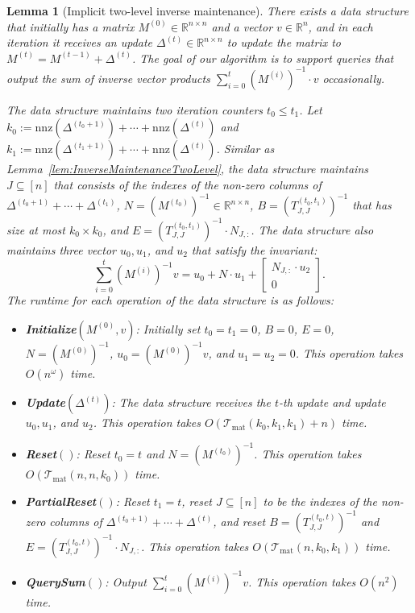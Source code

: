 \documentclass[11pt]{article}
\newtheorem{lemma}[theorem]{Lemma}
\newcommand{\Tmat}{\mathcal{T}_{\mathrm{mat}}}
\newcommand{\nnz}{\mathrm{nnz}}
\newcommand\uu{\boldsymbol{\mathit{u}}}
\newcommand\vv{\boldsymbol{\mathit{v}}}
\newcommand\BB{\boldsymbol{\mathit{B}}}
\newcommand\EE{\boldsymbol{\mathit{E}}}
\newcommand\NN{\boldsymbol{\mathit{N}}}
\newcommand\MM{\boldsymbol{\mathit{M}}}
\newcommand\TT{\boldsymbol{\mathit{T}}}
\newcommand\R{\mathbb{R}}
\begin{document}
\begin{lemma}[Implicit two-level inverse maintenance]\label{lem:implicit_inverse_maintenance}
There exists a data structure that initially has a matrix $\MM^{(0)} \in \R^{n \times n}$ and a vector $\vv \in \R^{n}$, and in each iteration it receives an update $\Delta^{(t)} \in \R^{n \times n}$ to update the matrix to $\MM^{(t)} = \MM^{(t-1)} + \Delta^{(t)}$. The goal of our algorithm is to support queries that output the sum of inverse vector products $\sum_{i=0}^t (\MM^{(i)})^{-1} \cdot \vv$ occasionally.
 

The data structure maintains two iteration counters $t_0 \leq t_1$. Let $k_0 := \nnz(\Delta^{(t_0+1)}) + \cdots + \nnz(\Delta^{(t)})$ and $k_1 := \nnz(\Delta^{(t_1+1)}) + \cdots + \nnz(\Delta^{(t)})$. Similar as Lemma~\ref{lem:InverseMaintenanceTwoLevel}, the data structure maintains $J \subseteq [n]$ that consists of the indexes of the non-zero columns of $\Delta^{(t_0+1)} + \cdots + \Delta^{(t_1)}$, $\NN = (\MM^{(t_0)})^{-1} \in \R^{n \times n}$, $\BB = (\TT^{(t_0,t_1)}_{J,J})^{-1}$ that has size at most $k_0 \times k_0$, and $\EE = (\TT^{(t_0,t_1)}_{J,J})^{-1} \cdot \NN_{J,:}$. The data structure also maintains three vector $\uu_0, \uu_1$, and $\uu_2$ that satisfy the invariant:
\[
\sum_{i=0}^t (\MM^{(i)})^{-1} \vv = \uu_0 + \NN \cdot \uu_1 + \begin{bmatrix}
\NN_{J,:} \cdot \uu_2 \\ 0
\end{bmatrix}.
\]
The runtime for each operation of the data structure is as follows:
\begin{itemize}
\item {\bf Initialize$(\MM^{(0)}, \vv)$}: Initially set $t_0 = t_1 = 0$, $\BB = 0$, $\EE = 0$, $\NN = (\MM^{(0)})^{-1}$, $\uu_0 = (\MM^{(0)})^{-1} \vv$, and $\uu_1 = \uu_2 = 0$. This operation takes $O(n^{\omega})$ time.
\item {\bf Update$(\Delta^{(t)})$}: The data structure receives the $t$-th update and update $\uu_0, \uu_1$, and $\uu_2$. This operation takes $O(\Tmat(k_0, k_1, k_1) + n)$ time.
\item {\bf Reset$()$}: Reset $t_0 = t$ and $\NN = (\MM^{(t_0)})^{-1}$.  This operation takes $O(\Tmat(n, n, k_0))$ time.
\item {\bf PartialReset$()$}: Reset $t_1 = t$, reset $J \subseteq [n]$ to be the indexes of the non-zero columns of $\Delta^{(t_0+1)}+ \cdots + \Delta^{(t)}$, and reset $\BB = (\TT^{(t_0,t)}_{J,J})^{-1}$ and $\EE = (\TT^{(t_0,t)}_{J,J})^{-1} \cdot \NN_{J,:}$. This operation takes $O(\Tmat(n, k_0, k_1))$ time.

\item {\bf QuerySum$()$}: Output $\sum_{i=0}^t (\MM^{(i)})^{-1} \vv$. This operation takes $O(n^2)$ time.
\end{itemize}

\end{lemma}
\end{document}

